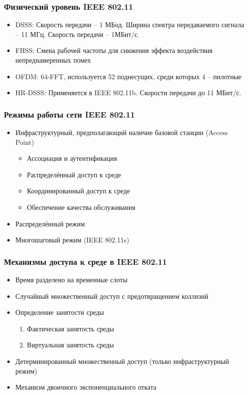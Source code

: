 \documentclass[utf8]{beamer}
\begin{document}
\begin{frame}
 \frametitle{Физический уровень IEEE 802.11}
\begin{itemize}
 \item DSSS: Скорость передачи -- 1 МБод. Ширина спектра передаваемого сигнала -- 11 МГц. Скорость передачи -- 1МБит/с.
 \item FHSS: Смена рабочей частоты для снижения эффекта воздействия непреднамеренных помех
 \item OFDM: 64-FFT, используется 52 поднесущих, среди которых 4 -- пилотные
 \item HR-DSSS: Применяется в IEEE 802.11b. Скорости передачи до 11 МБит/с.
\end{itemize}
\end{frame}
\begin{frame}
\frametitle{Режимы работы сети IEEE 802.11}
\begin{itemize}
 \item Инфраструктурный, предполагающий наличие базовой станции (Access Point)
 \begin{itemize}
  \item Ассоциация и аутентификация
  \item Распределённый доступ к среде
  \item Координированный доступ к среде
  \item Обеспечение качества обслуживания
 \end{itemize}
 \item Распределённый режим
 \item Многошаговый режим (IEEE 802.11s)
\end{itemize}
\end{frame}
\begin{frame}
\frametitle{Механизмы доступа к среде в IEEE 802.11}
\begin{itemize}
 \item Время разделено на временные слоты
 \item Случайный множественный доступ с предотвращением коллизий
 \item Определение занятости среды
 \begin{enumerate}
  \item Фактическая занятость среды
  \item Виртуальная занятость среды
 \end{enumerate}

 \item Детерминированный множественный доступ (только инфраструктурный режим)
 \item Механизм двоичного экспоненциального отката
\end{itemize}
\end{frame}
\end{document}
